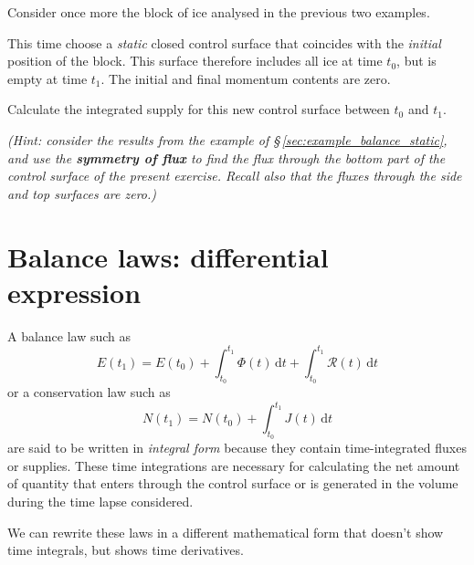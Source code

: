 \documentclass[a4paper,12pt,%
onecolumn,oneside,%
british%
]{memoir}
\newcommand*{\di}{\mathrm{d}}%
\renewcommand*{\|}[1][]{\nonscript\:#1\vert\nonscript\:\mathopen{}}
\newcommand*{\sect}{\S}%
\newcommand*{\yti}{t_{0}}
\newcommand*{\ytf}{t_{1}}
\newcommand*{\dt}{\di t}
\newcommand*{\yN}{N}
\newcommand*{\yJ}{J}
\newcommand*{\yE}{E}
\newcommand*{\yH}{\varPhi}%
\newcommand*{\yR}{\mathcal{R}}%
\begin{document}
\medskip

\begin{exercise}
  Consider once more the block of ice analysed in the previous two examples.

  This time choose a \emph{static} closed control surface that coincides with the \emph{initial} position of the block. This surface therefore includes all ice at time $\yti$, but is empty at time $\ytf$. The initial and final momentum contents are zero.

  Calculate the integrated supply for this new control surface between $\yti$ and $\ytf$.

  \emph{(Hint: consider the results from the example of \sect\,\ref{sec:example_balance_static}, and use the \textbf{symmetry of flux} to find the flux through the bottom part of the control surface of the present exercise. Recall also that the fluxes through the side and top surfaces are zero.)}
\end{exercise}







\section{Balance laws: differential expression}
\label{sec:balance_laws_diff}

A balance law such as
\begin{equation*}
  \yE(\ytf) = \yE(\yti)
  + \int_{\yti}^{\ytf}\!\!\yH(t)\, \dt
  + \int_{\yti}^{\ytf}\!\!\yR(t)\,\dt
\end{equation*}
or a conservation law such as
\begin{equation*}
    \yN(\ytf) = \yN(\yti) + \int_{\yti}^{\ytf}\!\!\yJ(t)\, \dt
\end{equation*}
are said to be written in \emph{integral form} because they contain time-integrated fluxes or supplies. These time integrations are necessary for calculating the net amount of quantity that enters through the control surface or is generated in the volume during the time lapse considered.

We can rewrite these laws in a different mathematical form that doesn't show time integrals, but shows time derivatives.
\end{document}
